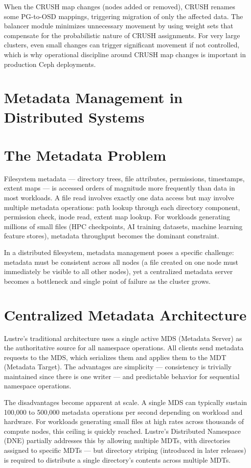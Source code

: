 When the CRUSH map changes (nodes added or removed), CRUSH renames some PG-to-OSD mappings, triggering migration of only the affected data. The balancer module minimizes unnecessary movement by using weight sets that compensate for the probabilistic nature of CRUSH assignments. For very large clusters, even small changes can trigger significant movement if not controlled, which is why operational discipline around CRUSH map changes is important in production Ceph deployments.

\section{Metadata Management in Distributed Systems}
\section{The Metadata Problem}
Filesystem metadata --- directory trees, file attributes, permissions, timestamps, extent maps --- is accessed orders of magnitude more frequently than data in most workloads. A file read involves exactly one data access but may involve multiple metadata operations: path lookup through each directory component, permission check, inode read, extent map lookup. For workloads generating millions of small files (HPC checkpoints, AI training datasets, machine learning feature stores), metadata throughput becomes the dominant constraint.

In a distributed filesystem, metadata management poses a specific challenge: metadata must be consistent across all nodes (a file created on one node must immediately be visible to all other nodes), yet a centralized metadata server becomes a bottleneck and single point of failure as the cluster grows.

\section{Centralized Metadata Architecture}
Lustre's traditional architecture uses a single active MDS (Metadata Server) as the authoritative source for all namespace operations. All clients send metadata requests to the MDS, which serializes them and applies them to the MDT (Metadata Target). The advantages are simplicity --- consistency is trivially maintained since there is one writer --- and predictable behavior for sequential namespace operations.

The disadvantages become apparent at scale. A single MDS can typically sustain 100,000 to 500,000 metadata operations per second depending on workload and hardware. For workloads generating small files at high rates across thousands of compute nodes, this ceiling is quickly reached. Lustre's Distributed Namespace (DNE) partially addresses this by allowing multiple MDTs, with directories assigned to specific MDTs --- but directory striping (introduced in later releases) is required to distribute a single directory's contents across multiple MDTs.

